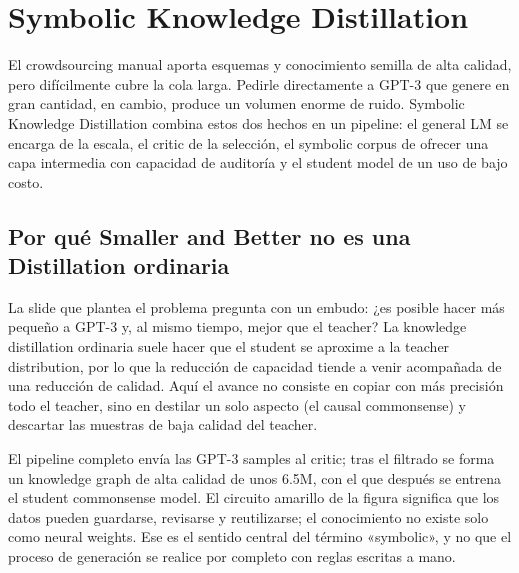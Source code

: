\section{Symbolic Knowledge Distillation}

El crowdsourcing manual aporta esquemas y conocimiento semilla de alta calidad, pero difícilmente cubre la cola larga. Pedirle directamente a GPT-3 que genere en gran cantidad, en cambio, produce un volumen enorme de ruido. Symbolic Knowledge Distillation combina estos dos hechos en un pipeline: el general LM se encarga de la escala, el critic de la selección, el symbolic corpus de ofrecer una capa intermedia con capacidad de auditoría y el student model de un uso de bajo costo.

\subsection{Por qué Smaller and Better no es una Distillation ordinaria}

La slide que plantea el problema pregunta con un embudo: ¿es posible hacer más pequeño a GPT-3 y, al mismo tiempo, mejor que el teacher? La knowledge distillation ordinaria suele hacer que el student se aproxime a la teacher distribution, por lo que la reducción de capacidad tiende a venir acompañada de una reducción de calidad. Aquí el avance no consiste en copiar con más precisión todo el teacher, sino en destilar un solo aspecto (el causal commonsense) y descartar las muestras de baja calidad del teacher.


El pipeline completo envía las GPT-3 samples al critic; tras el filtrado se forma un knowledge graph de alta calidad de unos 6.5M, con el que después se entrena el student commonsense model. El circuito amarillo de la figura significa que los datos pueden guardarse, revisarse y reutilizarse; el conocimiento no existe solo como neural weights. Ese es el sentido central del término «symbolic», y no que el proceso de generación se realice por completo con reglas escritas a mano.


